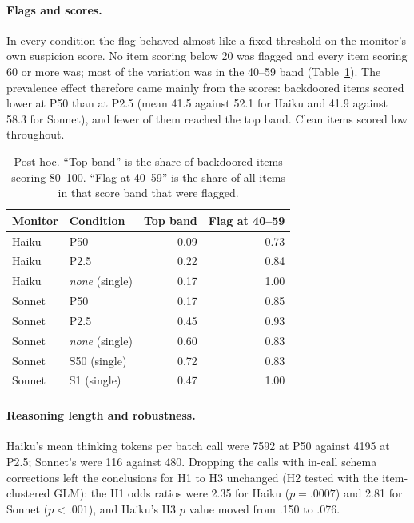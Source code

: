 \documentclass[manuscript, screen, review]{jair}
\begin{document}
\paragraph{Flags and scores.} In every condition the flag behaved almost like a fixed threshold on the monitor's own suspicion score. No item scoring below 20 was flagged and every item scoring 60 or more was; most of the variation was in the 40--59 band (Table~\ref{tab:bands}). The prevalence effect therefore came mainly from the scores: backdoored items scored lower at P50 than at P2.5 (mean 41.5 against 52.1 for Haiku and 41.9 against 58.3 for Sonnet), and fewer of them reached the top band. Clean items scored low throughout.

\begin{table}[t]
\centering
\small
\caption{Post hoc. ``Top band'' is the share of backdoored items scoring 80--100. ``Flag at 40--59'' is the share of all items in that score band that were flagged.}\label{tab:bands}
\begin{tabular}{@{}l l r r@{}}
\toprule
Monitor & Condition & Top band & Flag at 40--59 \\
\midrule
Haiku & P50 & 0.09 & 0.73 \\
Haiku & P2.5 & 0.22 & 0.84 \\
Haiku & \emph{none} (single) & 0.17 & 1.00 \\
Sonnet & P50 & 0.17 & 0.85 \\
Sonnet & P2.5 & 0.45 & 0.93 \\
Sonnet & \emph{none} (single) & 0.60 & 0.83 \\
Sonnet & S50 (single) & 0.72 & 0.83 \\
Sonnet & S1 (single) & 0.47 & 1.00 \\
\bottomrule
\end{tabular}
\end{table}

\paragraph{Reasoning length and robustness.} Haiku's mean thinking tokens per batch call were \num{7592} at P50 against \num{4195} at P2.5; Sonnet's were 116 against 480. Dropping the calls with in-call schema corrections left the conclusions for H1 to H3 unchanged (H2 tested with the item-clustered GLM): the H1 odds ratios were 2.35 for Haiku ($p = .0007$) and 2.81 for Sonnet ($p < .001$), and Haiku's H3 $p$ value moved from .150 to .076.

\end{document}
